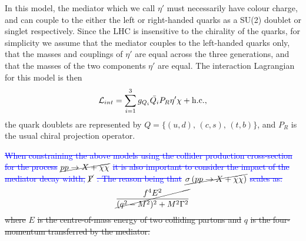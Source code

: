 \begin{flushleft}
In this model, the mediator which we call $\eta'$  must necessarily have colour charge, and can couple to the either the left or right-handed quarks as a SU(2) doublet or singlet respectively. Since the LHC is insensitive to the chirality of the quarks, for simplicity we assume that the mediator couples to the left-handed quarks only, that the masses and couplings of $\eta'$ are equal across the three generations, and that the masses of the two components $\eta'$ are equal. %
%
The interaction Lagrangian for this model is then 
\begin{equation}
\label{L_int_tS}
\mathcal{L}_{int} = \sum_{i=1}^3 g_{Q_i} \bar{Q_i} P_R \eta' \chi + {\rm h.c.},
\end{equation}
 the quark doublets are represented by $Q = \{ (u,d), \, (c, s), \, (t, b) \}$, and $P_R$ is the usual chiral projection operator. 


\hspace{1cm}\textcolor{blue}{\st{When constraining the above models using the collider production cross-section for the process }$\cancel{pp \rightarrow X + \bar{\chi}\chi}$\st{ it is also important to consider the impact of the mediator decay width, }$\cancel{\Gamma}$ \cite{}\st{. The reason being that }$\cancel{\sigma\left(pp \rightarrow X + \bar{\chi}\chi\right)}$\st{ scales as:}}
\begin{equation}
\label{cross_section}
\cancel{\frac{f^{4}E^{2}}{(q^{2} - M^{2})^{2} + M^2 \Gamma^{2}}}
\end{equation}
\st{where }$E$\st{ is the centre-of-mass energy of two colliding partons and }$q$\st{ is the four-momentum transferred by the mediator.}  


\end{flushleft}
